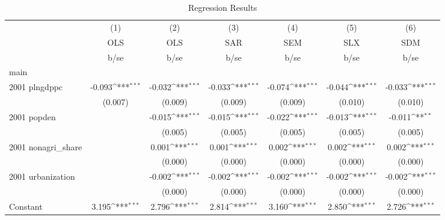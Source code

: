 \begin{table}[htbp]\centering
\def\sym#1{\ifmmode^{#1}\else\(^{#1}\)\fi}
\caption{Regression Results}
\begin{tabular}{l*{6}{c}}
\hline\hline
                    &\multicolumn{1}{c}{(1)}&\multicolumn{1}{c}{(2)}&\multicolumn{1}{c}{(3)}&\multicolumn{1}{c}{(4)}&\multicolumn{1}{c}{(5)}&\multicolumn{1}{c}{(6)}\\
                    &\multicolumn{1}{c}{OLS}&\multicolumn{1}{c}{OLS}&\multicolumn{1}{c}{SAR}&\multicolumn{1}{c}{SEM}&\multicolumn{1}{c}{SLX}&\multicolumn{1}{c}{SDM}\\
                    &        b/se         &        b/se         &        b/se         &        b/se         &        b/se         &        b/se         \\
\hline
main                &                     &                     &                     &                     &                     &                     \\
2001 plngdppc       &      -0.093\sym{***}&      -0.032\sym{***}&      -0.033\sym{***}&      -0.074\sym{***}&      -0.044\sym{***}&      -0.033\sym{***}\\
                    &     (0.007)         &     (0.009)         &     (0.009)         &     (0.009)         &     (0.010)         &     (0.010)         \\
2001 popden         &                     &      -0.015\sym{***}&      -0.015\sym{***}&      -0.022\sym{***}&      -0.013\sym{***}&      -0.011\sym{**} \\
                    &                     &     (0.005)         &     (0.005)         &     (0.005)         &     (0.005)         &     (0.005)         \\
2001 nonagri\_share  &                     &       0.001\sym{***}&       0.001\sym{***}&       0.002\sym{***}&       0.002\sym{***}&       0.002\sym{***}\\
                    &                     &     (0.000)         &     (0.000)         &     (0.000)         &     (0.000)         &     (0.000)         \\
2001 urbanization   &                     &      -0.002\sym{***}&      -0.002\sym{***}&      -0.002\sym{***}&      -0.002\sym{***}&      -0.002\sym{***}\\
                    &                     &     (0.000)         &     (0.000)         &     (0.000)         &     (0.000)         &     (0.000)         \\
Constant            &       3.195\sym{***}&       2.796\sym{***}&       2.814\sym{***}&       3.160\sym{***}&       2.850\sym{***}&       2.726\sym{***}\\

\end{tabular}
\end{table}
